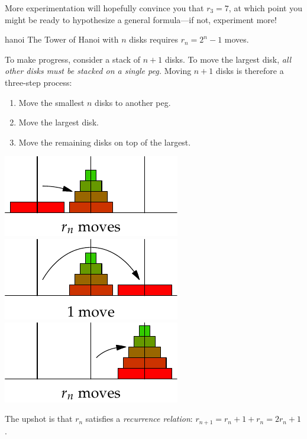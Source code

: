 More experimentation will hopefully convince you that $r_3=7$, at which point you might be ready to hypothesize a general formula---if not, experiment more!

\begin{conj}{}{hanoi}
	The Tower of Hanoi with $n$ disks requires $r_n=2^n-1$ moves.
\end{conj}

To make progress, consider a stack of $n+1$ disks. To move the largest disk, \emph{all other disks must be stacked on a single peg.} Moving $n+1$ disks is therefore a three-step process:
\begin{enumerate}\itemsep0pt
  \item Move the smallest $n$ disks to another peg.
  \item Move the largest disk.
  \item Move the remaining disks on top of the largest.
\end{enumerate}
\begin{center}
\href{http://www.math.uci.edu/~ndonalds/math13/induction-01-hanoi.html}{
	\includegraphics{induction-04-hanoirn3}\quad
	\includegraphics{induction-04-hanoirn4}\quad
	\includegraphics{induction-04-hanoirn5}
}
\end{center}


The upshot is that $r_n$ satisfies a \emph{recurrence relation}: $r_{n+1}=r_n+1+r_n=2r_n+1$.

